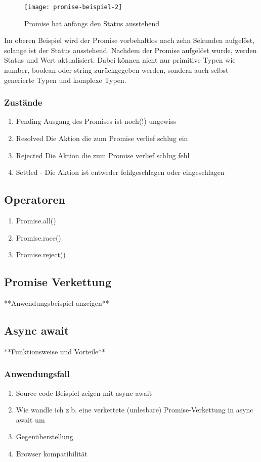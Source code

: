 \begin{figure}[H]
\centering
\texttt{[image: promise-beispiel-2]}
\caption{Promise hat anfangs den Status \glqq{}ausstehend\grqq{}}
\end{figure}

\noindent
Im oberen Beispiel wird der Promise vorbehaltlos nach zehn Sekunden aufgelöst, solange ist der Status ausstehend. Nachdem der Promise aufgelöst wurde, werden Status und Wert aktualisiert. Dabei können nicht nur primitive Typen wie number, boolean oder string zurückgegeben werden, sondern auch selbst generierte Typen und komplexe Typen.
\subsubsection{Zustände}

\begin{enumerate} 
\item Pending Ausgang des Promises ist noch(!) ungewiss
\item Resolved Die Aktion die zum Promise verlief schlug ein
\item Rejected Die Aktion die zum Promise verlief schlug fehl
\item Settled - Die Aktion ist entweder fehlgeschlagen oder eingeschlagen
\end{enumerate}

\subsection{Operatoren}

\begin{enumerate} 
\item Promise.all()
\item Promise.race() 
\item Promise.reject()
\end{enumerate}

\subsection{Promise Verkettung}
**Anwendungsbeispiel anzeigen**

\subsection{Async await}
**Funktionsweise und Vorteile**

\subsubsection{Anwendungsfall}

\begin{enumerate} 
\item Source code Beispiel zeigen mit async await
\item Wie wandle ich z.b. eine verkettete (unlesbare) Promise-Verkettung in async await um 
\item Gegenüberstellung
\item Browser kompatibilität
\end{enumerate}


